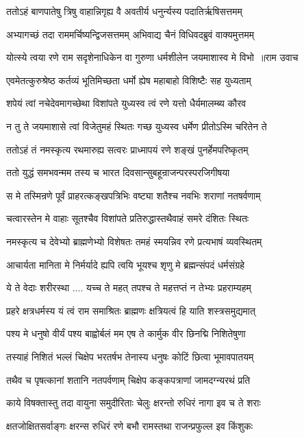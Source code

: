 \twolineshloka
{ततोऽहं बाणपातेषु त्रिषु वाहान्निगृह्य वै}
{अवतीर्य धनुर्न्यस्य पदातिर्ऋषिसत्तमम्}


\twolineshloka
{अभ्यागच्छं तदा राममर्चिष्यन्द्विजसत्तमम्}
{अभिवाद्य चैनं विधिवदब्रुवं वाक्यमुत्तमम्}


\threelineshloka
{योत्स्ये त्वया रणे राम सदृशेनाधिकेन वा}
{गुरुणा धर्मशीलेन जयमाशास्व मे विभो ॥राम उवाच}
{}


\twolineshloka
{एवमेतत्कुरुश्रेष्ठ कर्तव्यं भूतिमिच्छता}
{धर्मो ह्येष महाबाहो विशिष्टैः सह युध्यताम्}


\twolineshloka
{शपेयं त्वां नचेदेवमागच्छेथा विशांपते}
{युध्यस्व त्वं रणे यत्तो धैर्यमालम्ब्य कौरव}


\twolineshloka
{न तु ते जयमाशासे त्वां विजेतुमहं स्थितः}
{गच्छ युध्यस्व धर्मेण प्रीतोऽस्मि चरितेन ते}


\twolineshloka
{ततोऽहं तं नमस्कृत्य रथमारुह्य सत्वरः}
{प्राध्मापयं रणे शङ्खं पुनर्हेमपरिष्कृतम्}


\twolineshloka
{ततो युद्धं समभवन्मम तस्य च भारत}
{दिवसान्सुबहून्राजन्परस्परजिगीषया}


\twolineshloka
{स मे तस्मिन्रणे पूर्वं प्राहरत्कङ्खपत्रिभिः}
{वष्ट्या शतैश्च नवभिः शराणां नतषर्वणाम्}


\twolineshloka
{चत्वारस्तेन मे वाहाः सूतश्चैव विशांपते}
{प्रतिरुद्धास्तथैवाहं समरे दंशितः स्थितः}


\twolineshloka
{नमस्कृत्य च देवेभ्यो ब्राह्मणेभ्यो विशेषतः}
{तमहं स्मयन्निव रणे प्रत्यभाषं व्यवस्थितम्}


\twolineshloka
{आचार्यता मानिता मे निर्मर्यादे ह्यपि त्वयि}
{भूयश्च शृणु मे ब्रह्मन्संपदं धर्मसंग्रहे}


\twolineshloka
{ये ते वेदाः शरीरस्था .... यच्च ते महत्}
{तपश्च ते महत्तप्तं न तेभ्यः प्रहराम्यहम्}


\twolineshloka
{प्रहरे क्षत्रधर्मस्य यं त्वं राम समाश्रितः}
{ब्राह्मणः क्षत्रियत्वं हि याति शस्त्रसमुद्यमात्}


\twolineshloka
{पश्य मे धनुषो वीर्यं पश्य बाह्वोर्बलं मम}
{एष ते कार्मुक वीर छिनद्मि निशितेषुणा}


\twolineshloka
{तस्याहं निशितं भल्लं चिक्षेप भरतर्षभ}
{तेनास्य धनुषः कोटिं छित्वा भूमावपातयम्}


\threelineshloka
{तथैव च पृषत्कानां शतानि नतपर्वणाम्}
{चिक्षेप कङ्कपत्राणां जामदग्न्यरथं प्रति}
{}


\twolineshloka
{काये विषक्तास्तु तदा वायुना समुदीरिताः}
{चेलुः क्षरन्तो रुधिरं नागा इव च ते शराः}


\twolineshloka
{क्षतजोक्षितसर्वाङ्गः क्षरन्स रुधिरं रणे}
{बभौ रामस्तथा राजन्प्रफुल्ल इव किंशुकः}


